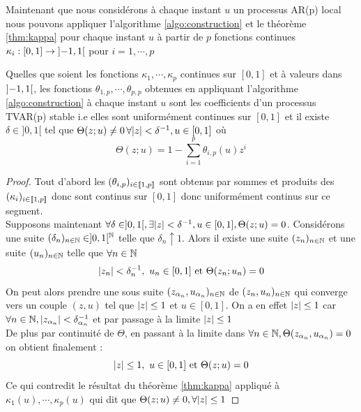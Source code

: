 \documentclass{report}
\begin{document}
Maintenant que nous considérons à chaque instant $u$ un processus AR(p) local nous pouvons appliquer l'algorithme \ref{algo:construction} et le théorème \ref{thm:kappa} pour chaque instant $u$ à partir de $p$ fonctions continues $\kappa_i :[0,1] \to {\left] -1,1 \right[}$ pour $i=1,\cdots,p$
\begin{Thm}
\label{thm:kappa_u}
Quelles que soient les fonctions $\kappa_1, \cdots, \kappa_p$ continues sur $[0,1]$ et à valeurs dans ${\left] -1,1 \right[}$, les fonctions $\theta_{1,p},\cdots, \theta_{p,p}$ obtenues en appliquant l'algorithme \ref{algo:construction} à chaque instant $u$ sont les coefficients d'un processus TVAR(p) stable i.e elles sont uniformément continues sur $[0,1]$ et il existe $\delta \in ]0,1[$ tel que $\Theta(z;u)\neq 0 \, \forall { \left| z \right|} < \delta^{-1}, u\in [0,1]$ où 
\[
\Theta(z;u) = 1 - \sum_{i=1}^p \theta_{i,p}(u) z^i
\]
\end{Thm}
\begin{proof} 
Tout d'abord les $(\theta_{i,p})_{i\in {\left\llbracket 1,p \right\rrbracket}}$ sont obtenus par sommes et produits des $(\kappa_i)_{i\in {\left\llbracket 1,p \right\rrbracket}}$ donc sont continus sur $[0,1]$ donc uniformément continus sur ce segment. \\
Supposons maintenant $\forall \delta \in ]0,1[, \exists { \left| z \right|} < \delta^{-1}, u\in [0,1], \Theta(z;u) = 0$. Considérons une suite $(\delta_n)_{n\in \mathbb{N}} \in ]0,1[^{\mathbb{N}}$ telle que $\delta_n \uparrow 1$. Alors il existe une suite $(z_n)_{n\in \mathbb{N}}$ et une suite $(u_n)_{n\in \mathbb{N}}$ telle que $\forall n \in \mathbb{N}$
$$
{ \left| z_n \right|} < \delta_n^{-1},
\,\,
u_n \in [0,1] 
\mbox{ et }
\Theta(z_n;u_n) = 0
$$
On peut alors prendre une sous suite $(z_{\alpha_n}, u_{\alpha_n})_{n\in \mathbb{N}}$ de $(z_n,u_n)_{n\in \mathbb{N}}$ qui converge vers un couple $(z,u)$ tel que ${ \left| z \right|} \leq 1$ et $u\in [0,1]$. On a en effet ${ \left| z \right|} \leq 1$ car $\forall n\in \mathbb{N}, { \left| z_{\alpha_n} \right|} < \delta_{\alpha_n}^{-1}$ et par passage à la limite ${ \left| z \right|} \leq 1$ \\
De plus par continuité de $\Theta$, en passant à la limite dans $\forall n\in \mathbb{N}, \Theta(z_{\alpha_n}, u_{\alpha_n}) = 0$ on obtient finalement :
$$
{ \left| z \right|} \leq 1,
\,\,
u \in [0,1] 
\mbox{ et }
\Theta(z;u) = 0
$$
Ce qui contredit le résultat du théorème \ref{thm:kappa} appliqué à $\kappa_1(u),\cdots,\kappa_p(u)$ qui dit que $\Theta(z;u) \neq 0, \forall { \left| z \right|}\leq 1$
\end{proof}
\end{document}
